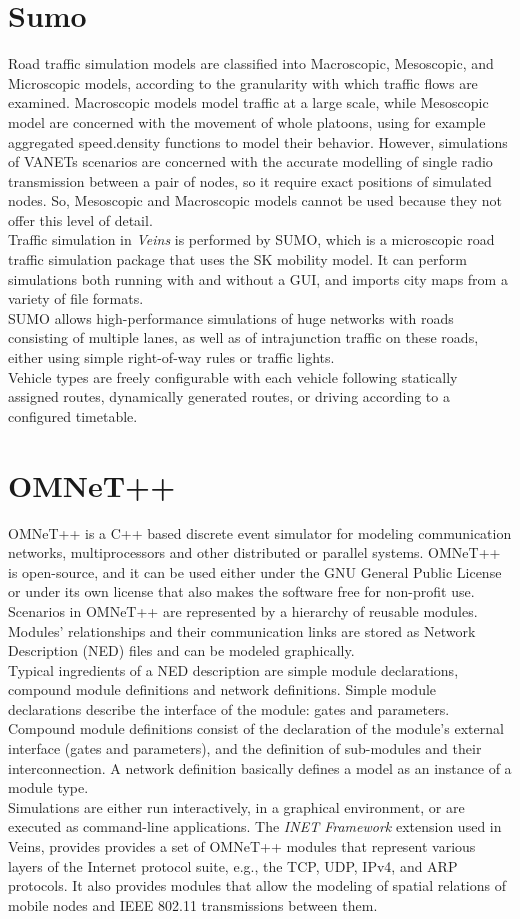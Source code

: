 \section{Sumo}
\label{sec:Sumo}
Road traffic simulation models are classified into Macroscopic, Mesoscopic, and Microscopic models, according to the granularity with which traffic flows are examined. Macroscopic models model traffic at a large scale, while Mesoscopic model are concerned with the movement of whole platoons, using for example aggregated speed.density functions to model their behavior. However, simulations of VANETs scenarios are concerned with the accurate modelling of single radio transmission between a pair of nodes, so it require exact positions of simulated nodes. So, Mesoscopic and Macroscopic models cannot be used because they not offer this level of detail. \\
Traffic simulation in \emph{Veins} is performed by SUMO, which is a microscopic road traffic simulation package that uses the SK \cite{krauss1998microscopic} mobility model.
It can perform simulations both running with and without a GUI, and imports city maps from a variety of file formats.\\
SUMO allows high-performance simulations of huge networks with roads consisting of multiple lanes, as well as of intrajunction traffic on these roads, either using simple right-of-way rules or traffic lights. \\
Vehicle types are freely configurable with each vehicle following statically assigned routes, dynamically generated routes, or driving according to a configured timetable.
\section{OMNeT++}
OMNeT++ is a C++ based discrete event simulator for modeling communication networks, multiprocessors and other distributed or parallel systems. OMNeT++ is open-source, and it can be used either under the GNU General Public License or under its own license that also makes the software free for non-profit use.\\
Scenarios in OMNeT++ are represented by a hierarchy of reusable modules. Modules’ relationships and their communication links are stored as Network Description (NED) files and can be modeled graphically.\\ Typical ingredients of a NED description are simple module declarations, compound module definitions and network definitions. Simple module declarations describe the interface of the module: gates and parameters. Compound module definitions consist of the declaration of the module's external interface (gates and parameters), and the definition of sub-modules and their interconnection. A network definition basically defines a model as an instance of a module type. \\
Simulations are either run interactively, in a graphical environment, or are executed as command-line applications. The \emph{INET Framework} extension used in Veins, provides provides a set of OMNeT++ modules that represent various layers of the Internet protocol suite, e.g., the TCP, UDP, IPv4, and ARP protocols. It also provides modules that allow the modeling of spatial relations of mobile nodes and IEEE 802.11 transmissions between them.
